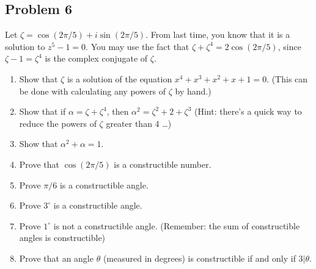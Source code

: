 \documentclass[letterpaper, 12pt]{amsart}
\theoremstyle{definition}  %
\begin{document}
	\subsection*{Problem 6}
	\label{sub:problem_6}
	Let $\zeta = \cos(2π/5) + i \sin(2π/5)$. 
	From last time, you know that it is a solution to $z^{5} - 1 = 0$. 
	You may use the fact that $\zeta + \zeta^{4} = 2 \cos(2\pi/5)$, since $\zeta - 1 = \zeta^{4}$ is the complex conjugate of $\zeta$.
		\begin{enumerate}[\hspace{5mm}(a)]
		\item Show that $\zeta$ is a solution of the equation $x^{4} + x^{3} + x^{2} + x + 1 = 0$. 
		(This can be done with calculating any powers of $\zeta$ by hand.)

		\item Show that if $\alpha = \zeta + \zeta^{4}$, then $\alpha^{2} = \zeta^{2} + 2 + \zeta^{3}$ 
		(Hint: there’s a quick way to reduce the powers of $\zeta$ greater than 4 \dots)

		\item Show that $\alpha^{2} + \alpha = 1$.

		\item Prove that $\cos(2\pi/5)$ is a constructible number.

		\item Prove $\pi/6$ is a constructible angle.

		\item Prove $3^{\circ}$ is a constructible angle.

		\item Prove $1^{\circ}$ is not a constructible angle. 
		(Remember: the sum of constructible angles is constructible)

		\item Prove that an angle $\theta$ (measured in degrees) is constructible if and only if $3|\theta$.
		\end{enumerate}
\end{document}
